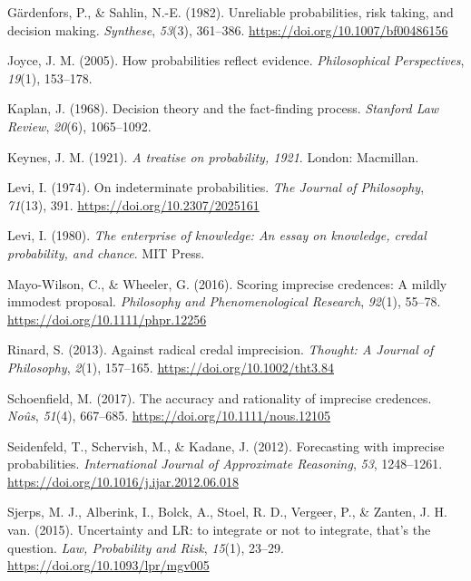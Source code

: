 \documentclass[
  10pt,
  dvipsnames,enabledeprecatedfontcommands]{scrartcl}
\newlength{\cslhangindent}
\newlength{\cslentryspacingunit} %
\newenvironment{CSLReferences}[2] %
 {%
  \setlength{\parindent}{0pt}
  \ifodd #1
  \let\oldpar\par
  \def\par{\hangindent=\cslhangindent\oldpar}
  \fi
  \setlength{\parskip}{#2\cslentryspacingunit}
 }%
 {}
\begin{document}
\begin{CSLReferences}{1}{0}
\leavevmode{}%
Gärdenfors, P., \& Sahlin, N.-E. (1982). Unreliable probabilities, risk
taking, and decision making. \emph{Synthese}, \emph{53}(3), 361--386.
\url{https://doi.org/10.1007/bf00486156}

\leavevmode{}%
Joyce, J. M. (2005). How probabilities reflect evidence.
\emph{Philosophical Perspectives}, \emph{19}(1), 153--178.

\leavevmode{}%
Kaplan, J. (1968). Decision theory and the fact-finding process.
\emph{Stanford Law Review}, \emph{20}(6), 1065--1092.

\leavevmode{}%
Keynes, J. M. (1921). \emph{A treatise on probability, 1921}. London:
Macmillan.

\leavevmode{}%
Levi, I. (1974). On indeterminate probabilities. \emph{The Journal of
Philosophy}, \emph{71}(13), 391. \url{https://doi.org/10.2307/2025161}

\leavevmode{}%
Levi, I. (1980). \emph{The enterprise of knowledge: An essay on
knowledge, credal probability, and chance}. MIT Press.

\leavevmode{}%
Mayo-Wilson, C., \& Wheeler, G. (2016). Scoring imprecise credences: A
mildly immodest proposal. \emph{Philosophy and Phenomenological
Research}, \emph{92}(1), 55--78.
\url{https://doi.org/10.1111/phpr.12256}

\leavevmode{}%
Rinard, S. (2013). Against radical credal imprecision. \emph{Thought: A
Journal of Philosophy}, \emph{2}(1), 157--165.
\url{https://doi.org/10.1002/tht3.84}

\leavevmode{}%
Schoenfield, M. (2017). The accuracy and rationality of imprecise
credences. \emph{Noûs}, \emph{51}(4), 667--685.
\url{https://doi.org/10.1111/nous.12105}

\leavevmode{}%
Seidenfeld, T., Schervish, M., \& Kadane, J. (2012). Forecasting with
imprecise probabilities. \emph{International Journal of Approximate
Reasoning}, \emph{53}, 1248--1261.
\url{https://doi.org/10.1016/j.ijar.2012.06.018}

\leavevmode{}%
Sjerps, M. J., Alberink, I., Bolck, A., Stoel, R. D., Vergeer, P., \&
Zanten, J. H. van. (2015). {Uncertainty and LR: to integrate or not to
integrate, that's the question}. \emph{Law, Probability and Risk},
\emph{15}(1), 23--29. \url{https://doi.org/10.1093/lpr/mgv005}


\end{CSLReferences}
\end{document}
